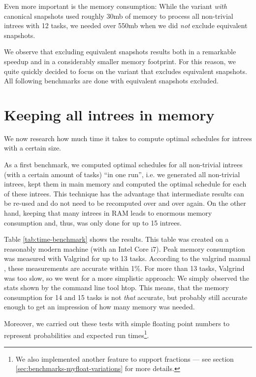 Even more important is the memory consumption: While the variant \emph{with} canonical snapshots used roughly 30mb of memory to process all non-trivial intrees with 12 tasks, we needed over 550mb when we did \emph{not} exclude equivalent snapshots.

We observe that excluding equivalent snapshots results both in a remarkable speedup and in a considerably smaller memory footprint. For this reason, we quite quickly decided to focus on the variant that excludes equivalent snapshots. All following benchmarks are done with equivalent snapshots excluded.

\section{Keeping all intrees in memory}
\label{sec:benchmarks-all-intrees-in-memory}

We now research how much time it takes to compute optimal schedules for intrees with a certain size.

As a first benchmark, we computed optimal schedules for all non-trivial intrees (with a certain amount of tasks) ``in one run'', i.e. we generated all non-trivial intrees, kept them in main memory and computed the optimal schedule for each of these intrees. This technique has the advantage that intermediate results can be re-used and do not need to be recomputed over and over again. On the other hand, keeping that many intrees in RAM leads to enormous memory consumption and, thus, was only done for up to 15 intrees.

Table \ref{tab:time-benchmark} shows the results. This table was created on a reasonably modern machine (with an Intel Core i7). Peak memory consumption was measured with Valgrind for up to 13 tasks. According to the valgrind manual \cite{massifmanual}, these measurements are accurate within 1\%. For more than 13 tasks, Valgrind was too slow, so we went for a more simplistic approach: We simply observed the stats shown by the command line tool htop. This means, that the memory consumption for 14 and 15 tasks is not \emph{that} accurate, but probably still accurate enough to get an impression of how many memory was needed.

Moreover, we carried out these tests with simple floating point numbers to represent probabilities and expected run times\footnote{We also implemented another feature to support fractions --- see section \ref{sec:benchmarks-myfloat-variations} for more details.}.

